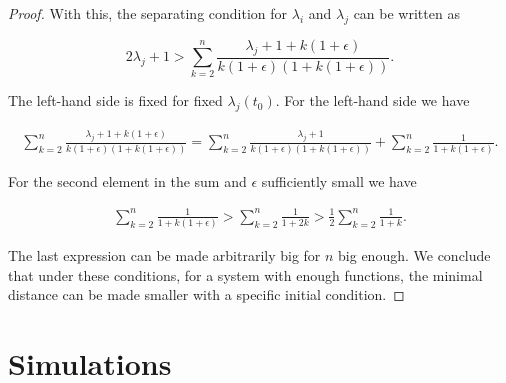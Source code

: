 \begin{proof}
    With this, the separating condition for $\lambda_i$ and $\lambda_j$ can be written as

    \begin{equation*}
        2\lambda_j + 1 > \sum_{k=2}^{n} \frac{\lambda_j + 1 + k(1+\epsilon)}{k(1+\epsilon)(1+k(1+\epsilon))}. 
    \end{equation*}

    The left-hand side is fixed for fixed $\lambda_j(t_0)$. For the left-hand side we have

    \begin{align*}
        \sum_{k=2}^{n} \frac{\lambda_j + 1 + k(1+\epsilon)}{k(1+\epsilon)(1+k(1+\epsilon))} = \sum_{k=2}^n \frac{\lambda_j + 1}{k(1+\epsilon)(1+k(1+\epsilon))} + \sum_{k=2}^n \frac{1}{1+k(1+\epsilon)}.
    \end{align*}

    For the second element in the sum and $\epsilon$ sufficiently small we have 

    \begin{align*}
        \sum_{k=2}^n \frac{1}{1+k(1+\epsilon)} > \sum_{k=2}^n \frac{1}{1+2k} > \frac12\sum_{k=2}^n \frac{1}{1+k}.
    \end{align*}

    The last expression can be made arbitrarily big for $n$ big enough. We conclude that under these conditions, for a system with enough functions, the minimal distance can be made smaller with a specific initial condition.
    
\end{proof}

\section{Simulations}